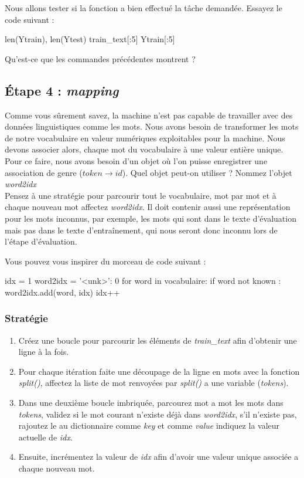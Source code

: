 Nous allons tester si la fonction a bien effectué la tâche demandée. Essayez le code suivant :
\begin{python}
len(Ytrain), len(Ytest)
train_text[:5]
Ytrain[:5]
\end{python}
Qu'est-ce que les commandes précédentes montrent ?

\subsection{Étape 4 : \textit{mapping}}

Comme vous sûrement savez, la machine n'est pas capable de travailler avec des données linguistiques comme les mots. Nous avons besoin de transformer les mots de notre vocabulaire en valeur numériques exploitables pour la machine.
Nous devons associer alors, chaque mot du vocabulaire à une valeur entière unique. Pour ce faire, nous avons besoin d'un objet où l'on puisse enregistrer une association de genre (${token \rightarrow id}$).
Quel objet peut-on utiliser ? Nommez l'objet \textit{word2idx}\\

Pensez à une stratégie pour parcourir tout le vocabulaire, mot par mot et à chaque nouveau mot affectez \textit{word2idx}. Il doit contenir aussi une représentation pour les mots inconnus, par exemple, les mots qui sont dans le texte d'évaluation mais pas dans le texte d'entraînement, qui nous seront donc inconnu lors de l'étape d'évaluation.

Vous pouvez vous inspirer du morceau de code suivant :

\begin{python}
idx = 1
word2idx = {'<unk>': 0}
for word in vocabulaire:
 if word not known :
  word2idx.add(word, idx)
  idx++
\end{python}

\subsubsection{Stratégie}

\begin{enumerate}
	\item Créez une boucle pour parcourir les éléments de \textit{train\_text} afin d'obtenir une ligne à la fois.
	\item Pour chaque itération faite une découpage de la ligne en mots avec la fonction \textit{split()}, affectez la liste de mot renvoyées par \textit{split()} a une variable (\textit{tokens}).
	\item Dans une deuxième boucle imbriquée, parcourez mot a mot les mots dans \textit{tokens}, validez si le mot courant n'existe déjà dans \textit{word2idx}, s'il n'existe pas, rajoutez le au dictionnaire comme \textit{key} et comme \textit{value} indiquez la valeur actuelle de \textit{idx}.
	\item Ensuite, incrémentez la valeur de \textit{idx} afin d'avoir une valeur unique associée a chaque nouveau mot.
\end{enumerate}



